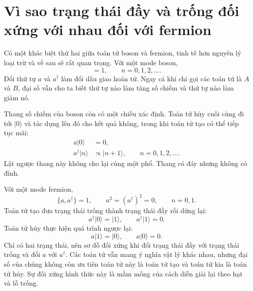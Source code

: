 \section{Vì sao trạng thái đầy và trống đối xứng với nhau đối với fermion}

Có một khác biệt thứ hai giữa toán tử boson và fermion, tinh tế hơn nguyên lý loại trừ và về sau sẽ rất quan trọng. Với một mode boson,
\begin{equation}
[a,a^\dagger]=1,
\qquad
n=0,1,2,\ldots.
\end{equation}
Đổi thứ tự \(a\) và \(a^\dagger\) làm đổi dấu giao hoán tử. Ngay cả khi chỉ gọi các toán tử là \(A\) và \(B\), đại số vẫn cho ta biết thứ tự nào làm tăng số chiếm và thứ tự nào làm giảm nó.

Thang số chiếm của boson còn có một chiều xác định. Toán tử hủy cuối cùng đi tới \(\lvert0\rangle\) và tác dụng lên đó cho kết quả không, trong khi toán tử tạo có thể tiếp tục mãi:
\begin{align}
a\lvert0\rangle&=0,\\
a^\dagger\lvert n\rangle&\propto\lvert n+1\rangle,
\qquad n=0,1,2,\ldots.
\end{align}
Lật ngược thang này không cho lại cùng một phổ. Thang có đáy nhưng không có đỉnh.

Với một mode fermion,
\begin{equation}
\{a,a^\dagger\}=1,
\qquad
a^2=(a^\dagger)^2=0,
\qquad
n=0,1.
\label{eq:l10-fermion-mode}
\end{equation}
Toán tử tạo đưa trạng thái trống thành trạng thái đầy rồi dừng lại:
\begin{equation}
a^\dagger\lvert0\rangle=\lvert1\rangle,
\qquad
a^\dagger\lvert1\rangle=0.
\end{equation}
Toán tử hủy thực hiện quá trình ngược lại:
\begin{equation}
a\lvert1\rangle=\lvert0\rangle,
\qquad
a\lvert0\rangle=0.
\end{equation}
Chỉ có hai trạng thái, nên sơ đồ đối xứng khi đổi trạng thái đầy với trạng thái trống và đổi \(a\) với \(a^\dagger\). Các toán tử vẫn mang ý nghĩa vật lý khác nhau, nhưng đại số của chúng không còn ưu tiên toán tử này là toán tử tạo và toán tử kia là toán tử hủy. Sự đối xứng hình thức này là mầm mống của cách diễn giải lại theo hạt và lỗ trống.

\begin{classroomqa}
\end{classroomqa}

